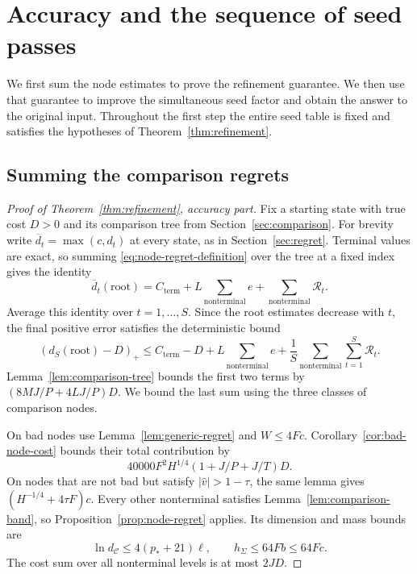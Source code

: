 \section{Accuracy and the sequence of seed passes}\label{sec:accuracy}
We first sum the node estimates to prove the refinement guarantee. We then
use that guarantee to improve the simultaneous seed factor and obtain the
answer to the original input. Throughout the first step the entire seed
table is fixed and satisfies the hypotheses of
Theorem~\ref{thm:refinement}.

\subsection{Summing the comparison regrets}
\begin{proof}[Proof of Theorem~\ref{thm:refinement}, accuracy part]
Fix a starting state with true cost $D>0$ and its comparison tree from
Section~\ref{sec:comparison}. For brevity write
$\overline d_t=\max(c,d_t)$ at every state, as in
Section~\ref{sec:regret}.  Terminal values are exact, so summing
\eqref{eq:node-regret-definition} over the tree at a fixed index gives
the identity
\[
 \overline d_t(\mathrm{root})
 =C_{\mathrm{term}}+L\sum_{\mathrm{nonterminal}}e
                      +\sum_{\mathrm{nonterminal}}\mathcal R_t.
\]
Average this identity over $t=1,\ldots,S$.  Since the root estimates
decrease with $t$, the final positive error satisfies the deterministic
bound
\begin{equation}\label{eq:root-regret-telescope}
 (d_S(\mathrm{root})-D)_+
 \le C_{\mathrm{term}}-D+L\sum_{\mathrm{nonterminal}}e
       +\frac1S\sum_{\mathrm{nonterminal}}\sum_{t=1}^S\mathcal R_t.
\end{equation}
Lemma~\ref{lem:comparison-tree} bounds the first two terms by
$(8MJ/P+4LJ/P)D$.  We bound the last sum using the three classes
of comparison nodes.

On bad nodes use Lemma~\ref{lem:generic-regret} and $W\le4Fc$.
Corollary~\ref{cor:bad-node-cost} bounds their total contribution by
\[
 40000F^2 H^{1/4}(1+J/P+J/T)D.
\]
On nodes that are not bad but satisfy $|\widehat v|>1-\tau$, the same
lemma gives $(H^{-1/4}+4\tau F)c$. Every other nonterminal satisfies
Lemma~\ref{lem:comparison-band}, so Proposition~\ref{prop:node-regret}
applies. Its dimension and mass bounds are
\[
 \ln d_{\mathcal C}\le4(p_*+21)\ell,\qquad h_\Sigma\le64Fb\le64Fc.
\]
The cost sum over all nonterminal levels is at most $2JD$.


\end{proof}
